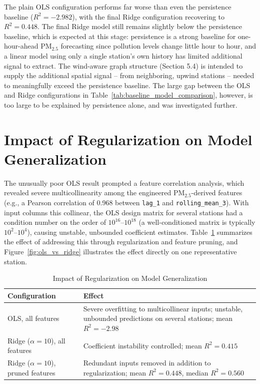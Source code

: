 The plain OLS configuration performs far worse than even the persistence baseline
($R^2 = -2.982$), with the final Ridge configuration recovering to $R^2 = 0.448$. The
final Ridge model still remains slightly below the persistence baseline, which is
expected at this stage: persistence is a strong baseline for one-hour-ahead PM$_{2.5}$
forecasting since pollution levels change little hour to hour, and a linear model using
only a single station's own history has limited additional signal to extract. The
wind-aware graph structure (Section 5.4) is intended to supply the additional spatial
signal -- from neighboring, upwind stations -- needed to meaningfully exceed the
persistence baseline. The large gap between the OLS and Ridge configurations in
Table~\ref{tab:baseline_model_comparison}, however, is too large to be explained by
persistence alone, and was investigated further.

\section{Impact of Regularization on Model Generalization}

The unusually poor OLS result prompted a feature correlation analysis, which revealed
severe multicollinearity among the engineered PM$_{2.5}$-derived features (e.g., a
Pearson correlation of 0.968 between \texttt{lag\_1} and \texttt{rolling\_mean\_3}). With
input columns this collinear, the OLS design matrix for several stations had a
condition number on the order of $10^{16}$--$10^{18}$ (a well-conditioned matrix is
typically $10^2$--$10^4$), causing unstable, unbounded coefficient estimates.
Table~\ref{tab:regularization_generalization_impact} summarizes the effect of
addressing this through regularization and feature pruning, and
Figure~\ref{fig:ols_vs_ridge} illustrates the effect directly on one representative
station.

\begin{table}[H]
    \centering
    \small
    \caption{Impact of Regularization on Model Generalization}
    \label{tab:regularization_generalization_impact}
    \renewcommand{\arraystretch}{1.2}
    \begin{tabularx}{0.94\linewidth}{|X|X|}
        \hline
        \textbf{Configuration} & \textbf{Effect} \\
        \hline
        OLS, all features & Severe overfitting to multicollinear inputs; unstable, unbounded predictions on several stations; mean $R^2 = -2.98$ \\
        \hline
        Ridge ($\alpha=10$), all features & Coefficient instability controlled; mean $R^2 = 0.415$ \\
        \hline
        Ridge ($\alpha=10$), pruned features & Redundant inputs removed in addition to regularization; mean $R^2 = 0.448$, median $R^2 = 0.560$ \\
        \hline
    \end{tabularx}
\end{table}

